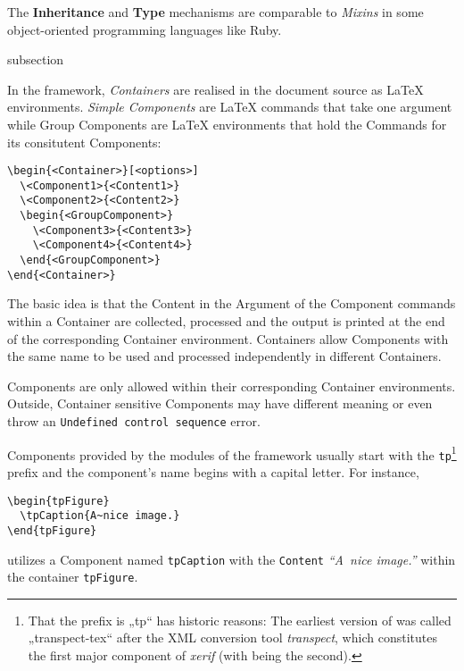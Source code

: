The \textbf{Inheritance} and \textbf{Type} mechanisms are comparable
to \textit{Mixins} in some object-oriented programming languages like
Ruby.


\begin{heading}{subsection}
\end{heading}

In the {\CoCoTeX} framework, \textit{Containers} are realised in the
document source as {\LaTeX} environments. \textit{Simple Components}
are {\LaTeX} commands that take one argument while Group Components
are {\LaTeX} environments that hold the Commands for its consitutent
Components:
\begin{lstlisting}[style=tex]
\begin{<Container>}[<options>]
  \<Component1>{<Content1>}
  \<Component2>{<Content2>}
  \begin{<GroupComponent>}
    \<Component3>{<Content3>}
    \<Component4>{<Content4>}
  \end{<GroupComponent>}
\end{<Container>}
\end{lstlisting}

The basic idea is that the Content in the Argument of the
Component commands within a Container are collected,
processed and the output is printed at the end of the corresponding
Container environment. Containers allow Components with the same name
to be used and processed independently in different Containers.

Components are only allowed within their corresponding Container
environments. Outside, Container sensitive Components may have
different meaning or even throw an \texttt{Undefined control sequence}
error.

Components provided by the modules of the {\CoCoTeX} framework usually
start with the \lstinline{tp}\footnote{That the prefix is „tp“ has
  historic reasons: The earliest version of {\CoCoTeX} was called
  „transpect-tex“ after the XML conversion tool \textit{transpect},
  which constitutes the first major component of \textit{xerif} (with
  {\CoCoTeX} being the second).} prefix and the component's name
begins with a capital letter. For instance,
\begin{lstlisting}[style=tex]
\begin{tpFigure}
  \tpCaption{A~nice image.}
\end{tpFigure}
\end{lstlisting}
utilizes a Component named \texttt{tpCaption} with the \texttt{Content}
\textit{“A~nice image.”} within the container \texttt{tpFigure}.


